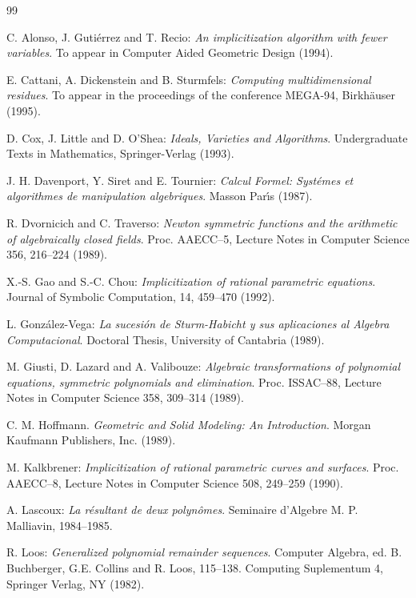 \begin{thebibliography}{99}

\bibitem[AGR94]{} C. Alonso, J. Guti\'errez and T. Recio: {\em An
implicitization algorithm with fewer variables}. To appear in
Computer Aided Geometric Design (1994). 



\bibitem[CDS94]{}  E. Cattani, A. Dickenstein and B. Sturmfels: {\em
Computing multidimensional residues}. To appear in the proceedings of
the conference MEGA-94, Birkh\"auser (1995).

\bibitem[CLO93]{} D. Cox, J. Little and D. O'Shea: {\em Ideals,
Varieties and Algorithms}. Undergraduate Texts in Mathematics,
Springer-Verlag (1993).


\bibitem[DST87]{} J. H. Davenport, Y. Siret and E. Tournier: {\em
Calcul Formel:  Syst\'emes et algorithmes de manipulation algebriques}.
Masson  Par\'{\i}s  (1987).

\bibitem[DT87]{} R. Dvornicich and C. Traverso: {\em Newton symmetric 
functions and the arithmetic of algebraically closed fields}. Proc.
AAECC--5, Lecture Notes in Computer Science 356, 216--224 (1989).

\bibitem[GC92]{} X.-S. Gao and S.-C. Chou: {\em Implicitization of
rational parametric equations}. Journal of Symbolic Computation, 14,
459--470 (1992).

\bibitem[GV89]{} L. Gonz\'alez-Vega: {\em La sucesi\'on de Sturm-Habicht y sus
aplicaciones al Algebra Computacional}. Doctoral Thesis, University of Cantabria
(1989).

\bibitem[GLV88]{} M. Giusti, D. Lazard and A. Valibouze: {\em 
Algebraic transformations of polynomial equations, symmetric polynomials
and elimination}. Proc. ISSAC--88, Lecture Notes in
Computer Science 358, 309--314 (1989).

\bibitem[H89]{} C. M. Hoffmann. {\em Geometric and Solid Modeling: An
Introduction}. Morgan Kaufmann Publishers, Inc. (1989).

\bibitem[K91]{} M. Kalkbrener: {\em Implicitization of rational
parametric curves and surfaces}. Proc. AAECC--8, Lecture Notes in
Computer Science 508, 249--259 (1990).

\bibitem[L84]{} A. Lascoux: {\em La r\'esultant de deux polyn\^omes}.
Seminaire d'Algebre M. P. Malliavin, 1984--1985.

\bibitem[L82]{} R. Loos: {\it Generalized polynomial remainder 
sequences}. Computer Algebra, ed. B. Buchberger, G.E. Collins and R.
Loos, 115--138. Computing Suplementum 4, Springer Verlag, NY (1982).


\end{thebibliography}
